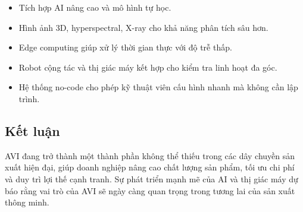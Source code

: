 \begin{itemize}
    \item Tích hợp AI nâng cao và mô hình tự học.
    \item Hình ảnh 3D, hyperspectral, X-ray cho khả năng phân tích sâu hơn.
    \item Edge computing giúp xử lý thời gian thực với độ trễ thấp.
    \item Robot cộng tác và thị giác máy kết hợp cho kiểm tra linh hoạt đa góc.
    \item Hệ thống no-code cho phép kỹ thuật viên cấu hình nhanh mà không cần lập trình.
\end{itemize}

\subsection*{Kết luận}

AVI đang trở thành một thành phần không thể thiếu trong các dây chuyền sản xuất hiện đại, giúp doanh nghiệp nâng cao chất lượng sản phẩm, tối ưu chi phí và duy trì lợi thế cạnh tranh. Sự phát triển mạnh mẽ của AI và thị giác máy dự báo rằng vai trò của AVI sẽ ngày càng quan trọng trong tương lai của sản xuất thông minh.
